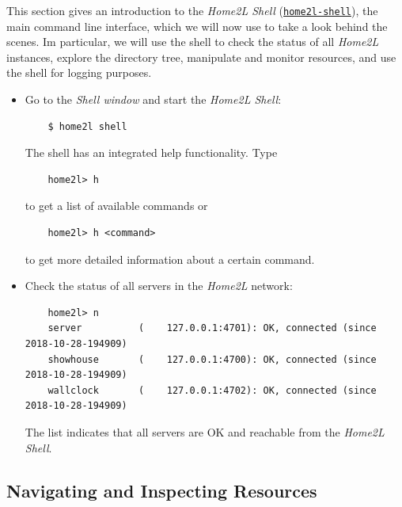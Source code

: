 \documentclass[12pt,english,parskip=half]{scrreprt}
\newcommand{\idx}[1]{#1\index{#1}}
\newcommand{\toolref}[1]{\hyperref[tool:#1]{\texttt{\idx{#1}}}}
\begin{document}
This section gives an introduction to the \emph{Home2L Shell} (\toolref{home2l-shell}),
the main command line interface, which we will now use to take a look behind the
scenes. Im particular, we will use the shell to check the status of all
\emph{Home2L} instances, explore the directory tree, manipulate and monitor
resources, and use the shell for logging purposes.

\begin{itemize}[$\blacktriangleright$]
\item
  Go to the \emph{Shell window} and start the \emph{Home2L Shell}:
  \begin{lstlisting}
    $ home2l shell
  \end{lstlisting}
  The shell has an integrated help functionality. Type
  \begin{lstlisting}
    home2l> h
  \end{lstlisting}
  to get a list of available commands or
  \begin{lstlisting}
    home2l> h <command>
  \end{lstlisting}
  to get more detailed information about a certain command.

\item
  Check the status of all servers in the \emph{Home2L} network:
  \begin{lstlisting}
    home2l> n
    server          (    127.0.0.1:4701): OK, connected (since 2018-10-28-194909)
    showhouse       (    127.0.0.1:4700): OK, connected (since 2018-10-28-194909)
    wallclock       (    127.0.0.1:4702): OK, connected (since 2018-10-28-194909)
  \end{lstlisting}
  The list indicates that all servers are OK and reachable from the
  \emph{Home2L Shell}.
\end{itemize}



\subsection{Navigating and Inspecting Resources}
\label{sec:tutorial-shell-inspect}
\end{document}
